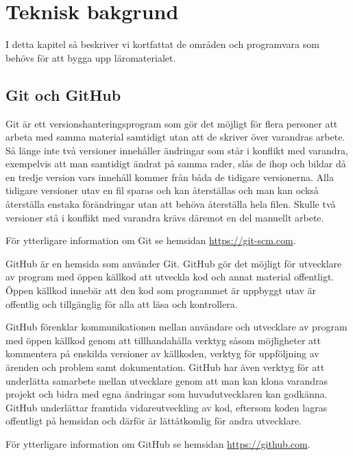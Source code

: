 \documentclass[]{article}
\begin{document}
\section{Teknisk bakgrund}
I detta kapitel så beskriver vi kortfattat de områden och programvara som
behövs för att bygga upp läromaterialet.

\subsection{Git och GitHub}
Git är ett versionshanteringsprogram som gör det möjligt för flera personer att
arbeta med samma material samtidigt utan att de skriver över varandras arbete.
Så länge inte två versioner innehåller ändringar som står i konflikt med
varandra, exempelvis att man samtidigt ändrat på samma rader, slås de ihop och
bildar då en tredje version vars innehåll kommer från båda de tidigare
versionerna. Alla tidigare versioner utav en fil sparas och kan återställas och
man kan också återställa enstaka förändringar utan att behöva återställa hela
filen. Skulle två versioner stå i konflikt med varandra krävs däremot en del
manuellt arbete.

För ytterligare information om Git se hemsidan \url{https://git-scm.com}.

GitHub är en hemsida som använder Git. GitHub gör det möjligt för utvecklare av
program med öppen källkod att utveckla kod och annat material offentligt.
Öppen källkod innebär att den kod som programmet är uppbyggt utav är offentlig
och tillgänglig för alla att läsa och kontrollera.

GitHub förenklar kommunikationen mellan användare och utvecklare av program med
öppen källkod genom att tillhandahålla verktyg såsom möjligheter att kommentera
på enskilda versioner av källkoden, verktyg för uppföljning av ärenden och
problem samt dokumentation. GitHub har även verktyg för att underlätta samarbete
mellan utvecklare genom att man kan klona varandras projekt och bidra med egna
ändringar som huvudutvecklaren kan godkänna. GitHub underlättar framtida
vidareutveckling av kod, eftersom koden lagras offentligt på hemsidan och
därför är lättåtkomlig för andra utvecklare.

För ytterligare information om GitHub se hemsidan \url{https://github.com}.
\end{document}
